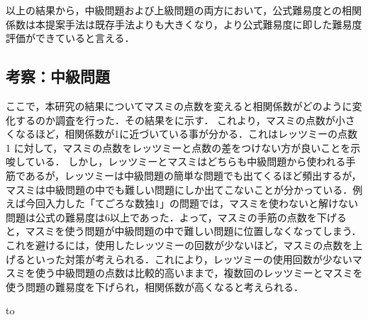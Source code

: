 \documentclass[submit,techrep,noauthor]{ipsj}
\begin{document}
以上の結果から，中級問題および上級問題の両方において，公式難易度との相関係数は本提案手法は既存手法よりも大きくなり，より公式難易度に即した難易度評価ができていると言える．


\subsection{考察：中級問題}

ここで，本研究の結果についてマスミの点数を変えると相関係数がどのように変化するのか調査を行った．その結果をに示す．
これより，マスミの点数が小さくなるほど，相関係数が1に近づいている事が分かる．これはレッツミーの点数 1 に対して，マスミの点数をレッツミーと点数の差をつけない方が良いことを示唆している．
しかし，レッツミーとマスミはどちらも中級問題から使われる手筋であるが，レッツミーは中級問題の簡単な問題でも出てくるほど頻出するが，マスミは中級問題の中でも難しい問題にしか出てこないことが分かっている．例えば今回入力した「てごろな数独1」の問題では，マスミを使わないと解けない問題は公式の難易度は6以上であった．よって，マスミの手筋の点数を下げると，マスミを使う問題が中級問題の中で難しい問題に位置しなくなってしまう．これを避けるには，使用したレッツミーの回数が少ないほど，マスミの点数を上げるといった対策が考えられる．これにより，レッツミーの使用回数が少ないマスミを使う中級問題の点数は比較的高いままで，複数回のレッツミーとマスミを使う問題の難易度を下げられ，相関係数が高くなると考えられる．

\begin{table}[tb]
		\caption{マスミの点数による相関係数の変化}
		\label{table:masumi}
		\hbox to
	\end{table}
\end{document}
